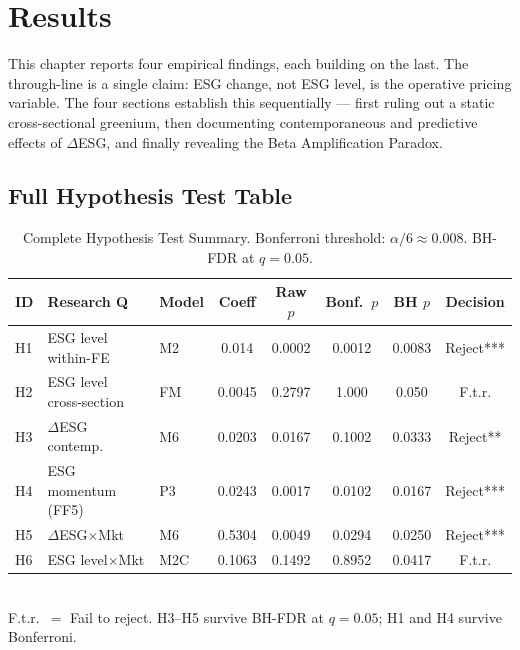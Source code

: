 \chapter{Results}
\label{chap:results}

This chapter reports four empirical findings, each building on the last. The through-line is a single claim: ESG change, not ESG level, is the operative pricing variable. The four sections establish this sequentially --- first ruling out a static cross-sectional greenium, then documenting contemporaneous and predictive effects of $\Delta$ESG, and finally revealing the Beta Amplification Paradox. 

\section{Full Hypothesis Test Table}
 
\begin{table}[H]
  \centering
  \caption{Complete Hypothesis Test Summary. Bonferroni threshold: $\alpha/6 \approx 0.008$. BH-FDR at $q=0.05$.}
  \label{tab:hyp_full}
  \small
  \begin{tabular}{lllccccc}
    \toprule
    ID & Research Q & Model & Coeff & Raw $p$ & Bonf.\ $p$ & BH $p$ & Decision \\
    \midrule
    H1 & ESG level within-FE     & M2  & 0.014  & 0.0002 & 0.0012 & 0.0083 & Reject*** \\
    H2 & ESG level cross-section & FM  & 0.0045 & 0.2797 & 1.000  & 0.050  & F.t.r. \\
    H3 & $\Delta$ESG contemp.    & M6  & 0.0203 & 0.0167 & 0.1002 & 0.0333 & Reject** \\
    H4 & ESG momentum (FF5)      & P3  & 0.0243 & 0.0017 & 0.0102 & 0.0167 & Reject*** \\
    H5 & $\Delta$ESG$\times$Mkt  & M6  & 0.5304 & 0.0049 & 0.0294 & 0.0250 & Reject*** \\
    H6 & ESG level$\times$Mkt    & M2C & 0.1063 & 0.1492 & 0.8952 & 0.0417 & F.t.r. \\
    \bottomrule
  \end{tabular}
  \smallskip\\
  \footnotesize F.t.r.\ $=$ Fail to reject. H3--H5 survive BH-FDR at $q=0.05$; H1 and H4 survive Bonferroni.
\end{table}

